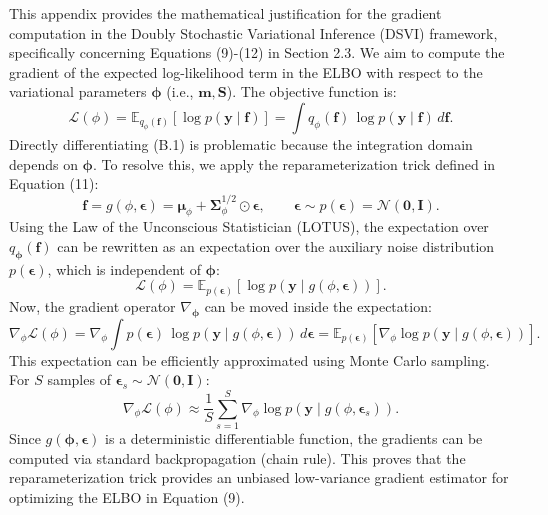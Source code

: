 \documentclass[11pt]{article}
\begin{document}
	This appendix provides the mathematical justification for the gradient computation in the Doubly Stochastic Variational Inference (DSVI) framework, specifically concerning Equations (9)-(12) in Section 2.3.
	We aim to compute the gradient of the expected log-likelihood term in the ELBO with respect to the variational parameters $\boldsymbol{\phi}$ (i.e., $\mathbf{m}, \mathbf{S}$). The objective function is:
	\begin{equation}
		\mathcal{L}(\phi)
		= \mathbb{E}_{q_{\phi}(\mathbf{f})}\!\left[\log p(\mathbf{y}\mid \mathbf{f})\right]
		= \int q_{\phi}(\mathbf{f})\,\log p(\mathbf{y}\mid \mathbf{f})\,d\mathbf{f}.
	\end{equation}
	Directly differentiating (B.1) is problematic because the integration domain depends on $\boldsymbol{\phi}$. To resolve this, we apply the reparameterization trick defined in Equation (11):
	\begin{equation}
		\mathbf{f}
		= g(\phi,\boldsymbol{\epsilon})
		= \boldsymbol{\mu}_{\phi} + \boldsymbol{\Sigma}_{\phi}^{1/2}\odot \boldsymbol{\epsilon},
		\qquad
		\boldsymbol{\epsilon}\sim p(\boldsymbol{\epsilon})=\mathcal{N}(\mathbf{0},\mathbf{I}).
	\end{equation}
	Using the Law of the Unconscious Statistician (LOTUS), the expectation over $q_{\boldsymbol{\phi}}(\mathbf{f})$ can be rewritten as an expectation over the auxiliary noise distribution $p(\boldsymbol{\epsilon})$, which is independent of $\boldsymbol{\phi}$:
	\begin{equation}
		\mathcal{L}(\phi)
		= \mathbb{E}_{p(\boldsymbol{\epsilon})}\!\left[\log p\!\left(\mathbf{y}\mid g(\phi,\boldsymbol{\epsilon})\right)\right].
	\end{equation}
	Now, the gradient operator $\nabla_{\boldsymbol{\phi}}$ can be moved inside the expectation:
	\begin{equation}
		\nabla_{\phi}\mathcal{L}(\phi)
		= \nabla_{\phi}\int p(\boldsymbol{\epsilon})\,\log p\!\left(\mathbf{y}\mid g(\phi,\boldsymbol{\epsilon})\right)\,d\boldsymbol{\epsilon}
		= \mathbb{E}_{p(\boldsymbol{\epsilon})}\!\left[\nabla_{\phi}\log p\!\left(\mathbf{y}\mid g(\phi,\boldsymbol{\epsilon})\right)\right].
	\end{equation}
	This expectation can be efficiently approximated using Monte Carlo sampling. For $S$ samples of $\boldsymbol{\epsilon}_s \sim \mathcal{N}(\mathbf{0}, \mathbf{I})$:
	\begin{equation}
		\nabla_{\phi}\mathcal{L}(\phi)
		\approx \frac{1}{S}\sum_{s=1}^{S}\nabla_{\phi}\log p\!\left(\mathbf{y}\mid g(\phi,\boldsymbol{\epsilon}_s)\right).
	\end{equation}
	Since $g(\boldsymbol{\phi}, \boldsymbol{\epsilon})$ is a deterministic differentiable function, the gradients can be computed via standard backpropagation (chain rule). This proves that the reparameterization trick provides an unbiased low-variance gradient estimator for optimizing the ELBO in Equation (9).
	
\end{document}
